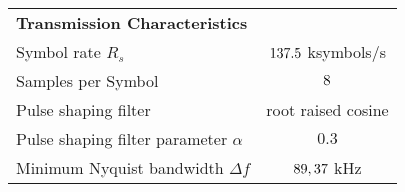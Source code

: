 \begin{table}[htbp]
\begin{tabular}{lc}
    \rowcolor[rgb]{ 0,  0,  0} \textcolor[rgb]{ 1,  1,  1}{\textbf{Transmission Characteristics}} & \textcolor[rgb]{ 1,  1,  1}{} 		\\
    	Symbol rate $R_s$ 						& $137.5$ ksymbols/s 				\\
    	Samples per Symbol 					& $8$													\\
	Pulse shaping filter 						& root raised cosine 											\\
    	Pulse shaping filter parameter $\alpha$ 		& $0.3$ 													\\
    	Minimum Nyquist bandwidth $\Delta f$ 		& $89,37$ kHz 							\\
    \end{tabular}
  \label{tab:specs_data}
\end{table}

